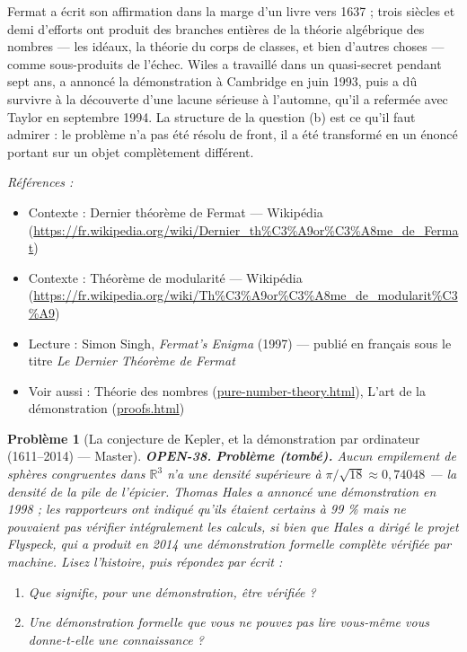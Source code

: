 \documentclass[11pt]{article}
\newtheorem{problem}{Problème}
\newenvironment{refs}{\par\small\noindent\emph{Références :}\begin{itemize}\setlength\itemsep{0pt}}{\end{itemize}\normalsize}
\begin{document}
\noindent Fermat a écrit son affirmation dans la marge d'un livre vers 1637 ; trois
siècles et demi d'efforts ont produit des branches entières de la théorie algébrique des
nombres --- les idéaux, la théorie du corps de classes, et bien d'autres choses --- comme
sous-produits de l'échec. Wiles a travaillé dans un quasi-secret pendant sept ans, a
annoncé la démonstration à Cambridge en juin 1993, puis a dû survivre à la découverte d'une
lacune sérieuse à l'automne, qu'il a refermée avec Taylor en septembre 1994. La structure
de la question (b) est ce qu'il faut admirer : le problème n'a pas été résolu de front, il
a été transformé en un énoncé portant sur un objet complètement différent.

\begin{refs}
\item Contexte : Dernier théorème de Fermat --- Wikipédia (\url{https://fr.wikipedia.org/wiki/Dernier_th%C3%A9or%C3%A8me_de_Fermat})
\item Contexte : Théorème de modularité --- Wikipédia (\url{https://fr.wikipedia.org/wiki/Th%C3%A9or%C3%A8me_de_modularit%C3%A9})
\item Lecture : Simon Singh, \textit{Fermat's Enigma} (1997) --- publié en français sous le titre \textit{Le Dernier Théorème de Fermat}
\item Voir aussi : Théorie des nombres (\url{pure-number-theory.html}), L'art de la démonstration (\url{proofs.html})
\end{refs}

\bigskip

\begin{problem}[{La conjecture de Kepler, et la démonstration par ordinateur (1611--2014) --- Master}]
\textbf{OPEN-38.} \textbf{Problème (tombé).} Aucun empilement de sphères congruentes dans
$ \mathbb{R}^3 $ n'a une densité supérieure à $ \pi/\sqrt{18} \approx 0{,}74048 $ --- la
densité de la pile de l'épicier. Thomas Hales a annoncé une démonstration en 1998 ; les
rapporteurs ont indiqué qu'ils étaient \og{} certains à 99 \% \fg{} mais ne pouvaient pas vérifier
intégralement les calculs, si bien que Hales a dirigé le projet Flyspeck, qui a produit en
2014 une démonstration formelle complète vérifiée par machine. Lisez l'histoire, puis
répondez par écrit :
\begin{enumerate}
\item[(a)] Que signifie, pour une démonstration, être \textit{vérifiée} ?
\item[(b)] Une démonstration formelle que vous ne pouvez pas lire vous-même vous donne-t-elle une
connaissance ?
\end{enumerate}

\end{problem}
\end{document}
